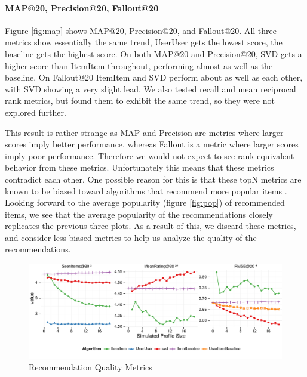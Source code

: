 \documentclass[letterpaper]{sig-alternate}
\begin{document}
\paragraph{MAP@20, Precision@20, Fallout@20}
  Figure \ref{fig:map} shows MAP@20, Precision@20, and Fallout@20.
  All three metrics show essentially the same trend, UserUser gets the lowest score, the baseline gets the highest score.
  On both MAP@20 and Precision@20, SVD gets a higher score than ItemItem throughout, performing almost as well as the baseline.
  On Fallout@20 ItemItem and SVD perform about as well as each other, with SVD showing a very slight lead.
  We also tested recall and mean reciprocal rank metrics, but found them to exhibit the same trend, so they were not explored further.

  This result is rather strange as MAP and Precision are metrics where larger scores imply better performance, whereas Fallout is a metric where larger scores imply poor performance.
  Therefore we would not expect to see rank equivalent behavior from these metrics.
  Unfortunately this means that these metrics contradict each other.
  One possible reason for this is that these topN metrics are known to be biased toward algorithms that recommend more popular items \cite{bellogin}.
  Looking forward to the average popularity (figure \ref{fig:pop}) of recommended items, we see that the average popularity of the recommendations closely replicates the previous three plots.
  As a result of this, we discard these metrics, and consider less biased metrics to help us analyze the quality of the recommendations.


\begin{figure}[ht!]
  \centering
  \includegraphics[width=\linewidth]{../lenskit/output/ekstrandTuned20/rmse_20.pdf}
  \caption{Recommendation Quality Metrics}
  \label{fig:topN.rmse}
\end{figure}
\end{document}
